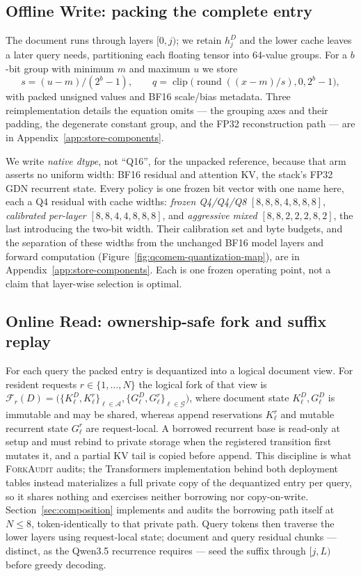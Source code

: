 \documentclass{article}
\newcommand{\method}{\textsc{ForkAudit}}
\begin{document}
\subsection{Offline Write: packing the complete entry}
\label{sec:write}

The document runs through layers $[0,j)$; we retain $h_j^D$ and the lower cache
leaves a later query needs, partitioning each floating tensor into 64-value
groups.  For a $b$-bit group with minimum $m$ and maximum $u$ we store
\begin{equation}
 s=(u-m)/(2^b-1),\qquad q=\operatorname{clip}
 \bigl(\operatorname{round}((x-m)/s),0,2^b-1\bigr),
 \label{eq:quant}
\end{equation}
with packed unsigned values and BF16 scale/bias metadata.  Three reimplementation details the equation omits --- the grouping axes and
their padding, the degenerate constant group, and the FP32 reconstruction path
--- are in Appendix~\ref{app:store-components}.

We write \emph{native dtype}, not ``Q16'', for the unpacked reference, because
that arm asserts no uniform width: BF16 residual and attention KV, the stack's
FP32 GDN recurrent state.  Every policy is one frozen bit vector with one name
here, each a Q4 residual with cache widths: \emph{frozen Q4/Q4/Q8}
$[8,8,8,4,8,8,8]$, \emph{calibrated per-layer} $[8,8,4,4,8,8,8]$, and
\emph{aggressive mixed} $[8,8,2,2,2,8,2]$, the last introducing the two-bit
width.  Their calibration set and byte budgets, and the separation of these
widths from the unchanged BF16 model layers and forward computation
(Figure~\ref{fig:qcomem-quantization-map}), are in
Appendix~\ref{app:store-components}.  Each is one frozen operating point, not a
claim that layer-wise selection is optimal.

\subsection{Online Read: ownership-safe fork and suffix replay}
\label{sec:read}

For each query the packed entry is dequantized into a logical document view.
For resident requests \(r\in\{1,\ldots,N\}\) the logical fork of that view is
\(\mathcal{F}_r(D)=\bigl(\{K^D_\ell,K^r_\ell\}_{\ell\in\mathcal A},
\{G^D_\ell,G^r_\ell\}_{\ell\in\mathcal G}\bigr)\), where document state
\(K^D_\ell,G^D_\ell\) is immutable and may be shared, whereas append
reservations \(K^r_\ell\) and mutable recurrent state \(G^r_\ell\) are
request-local. A borrowed recurrent base is read-only at setup and must rebind to private storage when
the registered transition first mutates it, and a partial KV tail is copied
before append. This discipline is what \method{} audits; the Transformers
implementation behind both deployment tables instead materializes a full
private copy of the dequantized entry per query, so it shares nothing and
exercises neither borrowing nor copy-on-write.  Section~\ref{sec:composition}
implements and audits the borrowing path itself at $N\leq8$, token-identically to
that private path. Query tokens then traverse the
lower layers using request-local state; document and query residual chunks ---
distinct, as the Qwen3.5 recurrence requires --- seed the suffix through
$[j,L)$ before greedy decoding.
\end{document}
